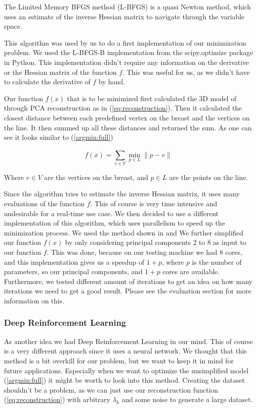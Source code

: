 The Limited Memory BFGS method (L-BFGS) is a quasi Newton method, which uses an estimate of the inverse Hessian matrix to navigate through the variable space. 

This algorithm was used by us to do a first implementation of our minimization problem. We used the L-BFGS-B implementation from the scipy.optimize package in Python. This implementation didn't require any information on the derivative
or the Hessian matrix of the function $f$. This was useful for us, as we didn't have to calculate the derivative of $f$ by hand. 

Our function $f(x)$ that is to be minimized first calculated the 3D model of through PCA reconstruction as in (\ref{eq:reconstruction}). Then it calculated the closest distance between each predefined vertex on the breast and the 
vertices on the line. It then summed up all these distances and returned the sum. As one can see it looks similar to (\ref{argmin:full})

\[
    f(x) = \sum_{v \in V}^{} \min_{p \in L} \lVert p - v \rVert
\]

Where $v \in V$ are the vertices on the breast, and $p \in L$ are the points on the line.

Since the algorithm tries to estimate the inverse Hessian matrix, it uses many evaluations of the function $f$. This of course is very time intensive and undesirable for a real-time use case. We then decided to use a different 
implementation of this algorithm, which uses parallelism to speed up the minimization process. We used the method shown in \cite{florian_gerber_2020_3888570} and \cite{RJ-2019-030} We further simplified our function $f(x)$ by only considering principal components 2 to 8 as input to our function $f$. 
This was done, because on our testing machine we had 8 cores, and this implementation gives us a speedup of $1+p$, where $p$ is the number of parameters, so our principal components, and $1+p$ cores are available. Furthermore, we tested different amount of iterations to get an 
idea on how many iterations we need to get a good result. Please see the evaluation section for more information on this.

\subsubsection{Deep Reinforcement Learning}

As another idea we had Deep Reinforcement Learning in our mind. This of course is a very different approach since it uses a neural network. We thought that this method is a bit overkill for our problem, but we want to keep it in mind
for future applications. Especially when we want to optimize the unsimplified model (\ref{argmin:full}) it might be worth to look into this method. Creating the dataset shouldn't be a problem, as we can
just use our reconstruction function (\ref{eq:reconstruction}) with arbitrary $\lambda_k$ and some noise to generate a large dataset.



